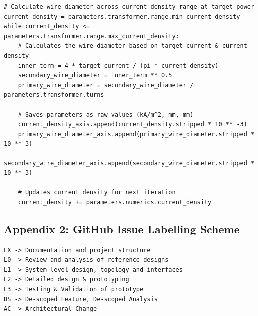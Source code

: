\documentclass[12pt,a4paper]{article}
\begin{document}
\begin{lstlisting}
# Calculate wire diameter across current density range at target power
current_density = parameters.transformer.range.min_current_density
while current_density <= parameters.transformer.range.max_current_density:
    # Calculates the wire diameter based on target current & current density
    inner_term = 4 * target_current / (pi * current_density)
    secondary_wire_diameter = inner_term ** 0.5
    primary_wire_diameter = secondary_wire_diameter / parameters.transformer.turns

    # Saves parameters as raw values (kA/m^2, mm, mm)
    current_density_axis.append(current_density.stripped * 10 ** -3)
    primary_wire_diameter_axis.append(primary_wire_diameter.stripped * 10 ** 3)
    secondary_wire_diameter_axis.append(secondary_wire_diameter.stripped * 10 ** 3)

    # Updates current density for next iteration
    current_density += parameters.numerics.current_density
\end{lstlisting}

\subsection{Appendix 2: GitHub Issue Labelling Scheme}

\begin{lstlisting}
LX -> Documentation and project structure
L0 -> Review and analysis of reference designs
L1 -> System level design, topology and interfaces
L2 -> Detailed design & prototyping
L3 -> Testing & Validation of prototype
DS -> De-scoped Feature, De-scoped Analysis
AC -> Architectural Change
\end{lstlisting}
\end{document}
